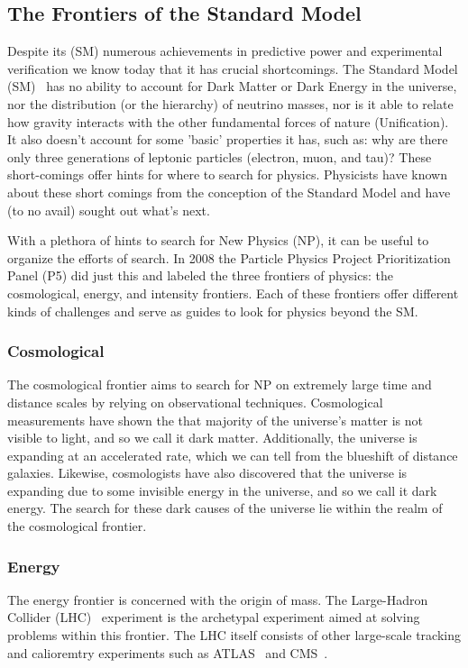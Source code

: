 \subsection{The Frontiers of the Standard Model}

Despite its (SM) numerous achievements in predictive power and experimental verification we know today that it has crucial shortcomings.
The Standard Model (SM)~\citep{GLASHOW1961579, salam1964electromagnetic, weinberg1967model} has no ability to account for Dark Matter or Dark Energy in the universe, nor the distribution (or the hierarchy) of neutrino masses, nor is it able to relate how gravity interacts with the other fundamental forces of nature (Unification).
It also doesn't account for some 'basic' properties it has, such as: why are there only three generations of leptonic particles (electron, muon, and tau)?
These short-comings offer hints for where to search for physics.
Physicists have known about these short comings from the conception of the Standard Model and have (to no avail) sought out what's next.

With a plethora of hints to search for New Physics (NP), it can be useful to organize the efforts of search.
In 2008 the Particle Physics Project Prioritization Panel (P5) did just this and labeled the three frontiers of physics: the cosmological, energy, and intensity frontiers.
Each of these frontiers offer different kinds of challenges and serve as guides to look for physics beyond the SM.

\subsubsection{Cosmological}
The cosmological frontier aims to search for NP on extremely large time and distance scales by relying on observational techniques.
Cosmological measurements have shown the that majority of the universe's matter is not visible to light, and so we call it dark matter.
Additionally, the universe is expanding at an accelerated rate, which we can tell from the blueshift of distance galaxies.
Likewise, cosmologists have also discovered that the universe is expanding due to some invisible energy in the universe, and so we call it dark energy.
The search for these dark causes of the universe lie within the realm of the cosmological frontier.

\subsubsection{Energy}
The energy frontier is concerned with the origin of mass.
The Large-Hadron Collider (LHC)~\citep{higgs_discovery_20121} experiment is the archetypal experiment aimed at solving problems within this frontier.
The LHC itself consists of other large-scale tracking and calioremtry experiments such as ATLAS~\citep{ATLAS:1999vwa} and CMS~\citep{CMS:2006myw}.


